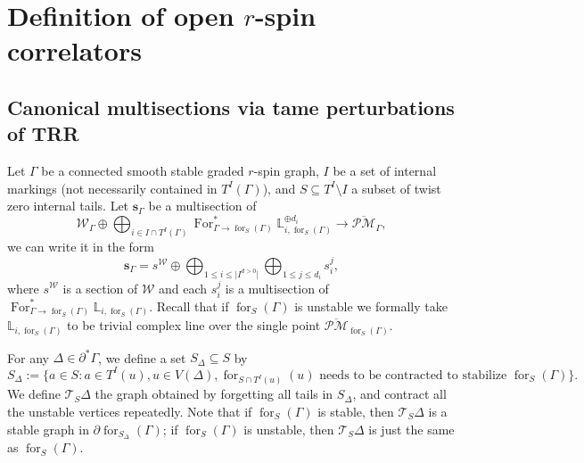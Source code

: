 \documentclass[11pt]{amsart}
\theoremstyle{definition}
\theoremstyle{remark}
\newcommand{\oPMb}{{\overline{\mathcal{PM}}}}
\newcommand{\<}{\left<}
\renewcommand{\>}{\right>}
\numberwithin{equation}{section}
\begin{document}
\section{Definition of open $r$-spin correlators}\label{sec sections def etc}


    \subsection{Canonical multisections via tame perturbations of TRR}\label{sec def of tame and canonical}
    Let $\Gamma$ be a connected smooth stable graded $r$-spin graph, $I$ be a set of internal markings (not necessarily contained in $T^I(\Gamma)$), and $S\subseteq T^I\setminus I$ a subset of twist zero internal tails.
    Let $\bm{s}_\Gamma$ be a multisection %
of 
    $$\mathcal W_{\Gamma}\oplus \bigoplus_{i\in I\cap T^I(\Gamma)} \operatorname{For}^*_{\Gamma \to \operatorname{for}_{S}(\Gamma)}{{\mathbb L}}_{i,\operatorname{for}_{S}(\Gamma)}^{\oplus d_i}\to \oPMb_\Gamma,$$ 
    we can %
write it in the form 
    $$\bm{s}_{\Gamma}=s^{\mathcal W}\oplus\bigoplus_{1\le i \le \lvert I^{d>0}\rvert}\bigoplus_{1\le j \le d_{i}} s^{j}_{i},$$
    where  $s^{\mathcal W}$ is a section of $\mathcal W$ and each $s^{j}_{i}$ is a multisection of $\operatorname{For}^*_{\Gamma \to \operatorname{for}_{S}(\Gamma)}{{\mathbb L}}_{i,\operatorname{for}_{S}(\Gamma)}$. Recall that if $\operatorname{for}_{S}(\Gamma)$ is unstable we formally take ${\mathbb L}_{i,\operatorname{for}_{S}(\Gamma)}$ to be trivial complex line over the single point $\oPMb_{\operatorname{for}_{S}(\Gamma)}$.

    For any $\Delta \in \partial^* \Gamma$, we define a set $S_\Delta \subseteq S$ %
by 
    $$
    S_{\Delta}:=\{a\in S\colon a\in T^I(u), u\in V(\Delta), \operatorname{for}_{S\cap T^I(u)}(u)\text{ needs to be contracted to stabilize }\operatorname{for}_{S}(\Gamma)\}.
    $$
    We %
define $\mathcal T_S \Delta$ the graph obtained by forgetting all tails in $S_{\Delta}$, and contract all the unstable vertices repeatedly. Note that if $\operatorname{for}_{S}(\Gamma)$ is stable, then $\mathcal T_S \Delta$ is a stable graph in $\partial \operatorname{for}_{S_\Delta}(\Gamma)$; if $\operatorname{for}_{S}(\Gamma)$ is unstable, then $\mathcal T_S \Delta$ is just the same as $\operatorname{for}_{S}(\Gamma)$. 
    
\end{document}
